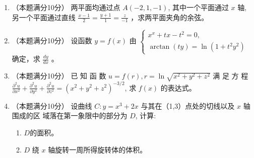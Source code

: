 \begin{enumerate}
\item 
（本题满分10分）
两平面均通过点 $A(-2,1,-1)$, 其中一个平面通过 $x$ 轴, 另一个平面通过直线 $\frac{x-1}{2}=\frac{y+1}{1}=\frac{z}{-1}$ ，求两平面夹角的余弦。




\item 
（本题满分10分）
设函数 $y=f(x)$ 由 $\left\{\begin{array}{c}x^{x}+t x-t^{2}=0, \\ \arctan (t y)=\ln \left(1+t^{2} y^{2}\right)\end{array}\right.$确定，求 $\frac{d y}{d x}$ 。




\item 
（本题满分10分）
已 知 函 数 $u=f(r), r=\ln \sqrt{x^{2}+y^{2}+z^{2}}$ 满 足 方 程$\frac{\partial^{2} u}{\partial x^{2}}+\frac{\partial^{2} u}{\partial y^{2}}+\frac{\partial^{2} u}{\partial z^{2}}=\left(x^{2}+y^{2}+z^{2}\right)^{-3 / 2}$, 求 $f(x)$ 的表达式。




\item 
（本题满分10分）
设曲线 $C: y=x^{3}+2 x$ 与其在（1,3）点处的切线以及 $x$ 轴围成的区 域落在第一象限中的部分为 $D$, 计算:
\begin{enumerate}
	\item
$  D  $的面积。
\item 
$D$ 绕 $x$ 轴旋转一周所得旋转体的体积。
\end{enumerate}

\end{enumerate}
